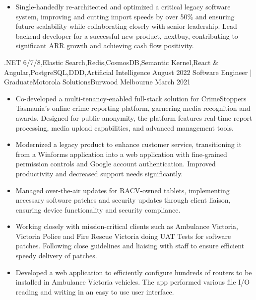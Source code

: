\begin{experiences}
{\begin{itemize}
                        \item Single-handedly re-architected and optimized a critical legacy software system, improving and cutting import speeds by over 50\% and ensuring future scalability while collaborating closely with senior leadership. Lead backend developer for a successful new product, nextbuy, contributing to significant ARR growth and achieving cash flow positivity.                                                                   
                      \end{itemize}
                    }
                    {.NET 6/7/8,Elastic Search,Redis,CosmosDB,Semantic Kernel,React \& Angular,PostgreSQL,DDD,Artificial Intelligence}
  \emptySeparator
  \experience
    {August 2022} {Software Engineer | Graduate}{Motorola Solutions}{Burwood Melbourne}
    {March 2021}    {
                      \begin{itemize}
                        \item Co-developed a multi-tenancy-enabled full-stack solution for CrimeStoppers Tasmania's online crime reporting platform, garnering media recognition and awards. Designed for public anonymity, the platform features real-time report processing, media upload capabilities, and advanced management tools.
                        \item Modernized a legacy product to enhance customer service, transitioning it from a Winforms application into a web application with fine-grained permission controls and Google account authentication. Improved productivity and decreased support needs significantly.
                        \item Managed over-the-air updates for RACV-owned tablets, implementing necessary software patches and security updates through client liaison, ensuring device functionality and security compliance.
                        \item Working closely with mission-critical clients such as Ambulance Victoria, Victoria Police and Fire Rescue Victoria doing UAT Tests for software patches. Following close guidelines and liaising with staff to ensure efficient speedy delivery of patches.
                        \item Developed a web application to efficiently configure hundreds of routers to be installed in Ambulance Victoria vehicles. The app performed various file I/O reading and writing in an easy to use user interface.
                      \end{itemize}
                    }

\end{experiences}
